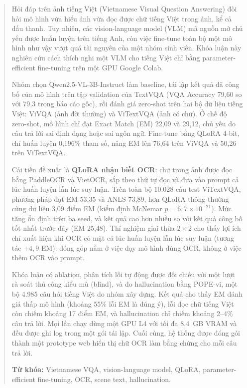 \begin{abstract}

Hỏi đáp trên ảnh tiếng Việt (Vietnamese Visual Question Answering) đòi hỏi mô hình
vừa hiểu ảnh vừa đọc được chữ tiếng Việt trong ảnh, kể cả dấu thanh. Tuy nhiên,
các vision-language model (VLM) mã nguồn mở chủ yếu được huấn luyện trên tiếng Anh,
còn việc fine-tune toàn bộ một mô hình như vậy vượt quá tài nguyên của một nhóm sinh
viên. Khóa luận này nghiên cứu cách thích nghi một VLM cho tiếng Việt chỉ bằng
parameter-efficient fine-tuning trên một GPU Google Colab.

Nhóm chọn Qwen2.5-VL-3B-Instruct làm baseline, tái lập kết quả đã công bố của mô hình
trên tập validation của TextVQA (VQA Accuracy 79,60 so với 79,3 trong báo cáo gốc),
rồi đánh giá zero-shot trên hai bộ dữ liệu tiếng
Việt: ViVQA (ảnh đời thường) và ViTextVQA (ảnh có chữ). Ở chế độ zero-shot,
mô hình chỉ đạt Exact Match (EM) 22,09 và 29,12, chủ yếu do câu trả lời sai định dạng
hoặc sai ngôn ngữ. Fine-tune bằng QLoRA 4-bit, chỉ huấn luyện 0,196\% tham số, nâng EM lên 76,64 trên ViVQA và 50,26 trên
ViTextVQA.

Cải tiến đề xuất là \textbf{QLoRA nhận biết OCR}: chữ trong ảnh được đọc bằng
PaddleOCR và VietOCR, sắp theo thứ tự đọc và đưa vào prompt cả lúc huấn luyện lẫn
lúc suy luận. Trên toàn bộ 10.028 câu test ViTextVQA, phương pháp đạt EM 53,35 và ANLS
73,89, hơn QLoRA thông thường cùng dữ liệu 3,09 điểm EM (kiểm định McNemar
$p = 6{,}7\times10^{-21}$). Mức tăng ổn định trên ba seed, và kết quả cao hơn nhiều so
với kết quả công bố tốt nhất trước đây (EM 25,48). Thí nghiệm giai thừa $2\times2$ cho thấy lợi ích chỉ xuất hiện
khi OCR có mặt cả lúc huấn luyện lẫn lúc suy luận (tương tác $+4{,}9$ EM): đóng góp
nằm ở việc dạy mô hình dùng OCR, không ở việc thêm OCR vào prompt.

Khóa luận có ablation, phân tích lỗi tự động được đối chiếu với một lượt rà soát thủ
công kiểu mù (blind), và đo hallucination bằng POPE-vi, một bộ 4.985 câu hỏi tiếng Việt
do nhóm xây dựng. Kết quả cho
thấy EM đánh giá thấp mô hình (khoảng 55\% lỗi EM là đúng ý), lỗi đọc chữ tiếng Việt
còn chiếm khoảng 17 điểm EM, và hallucination chỉ chiếm khoảng 2--4\% câu trả lời.
Mọi lần chạy dùng một GPU L4 với tối đa 8,4~GB VRAM và đều được ghi log trong một gói
tái lập. Cuối cùng, hệ thống được đóng gói thành một prototype web hiển thị chữ OCR
làm bằng chứng cho mỗi câu trả lời.

\vspace{1em}
{\sloppy\noindent\textbf{Từ khóa:} Vietnamese VQA, vision-language model, QLoRA,
parameter-efficient fine-tuning, OCR, scene text, hallucination.\par}

\end{abstract}
